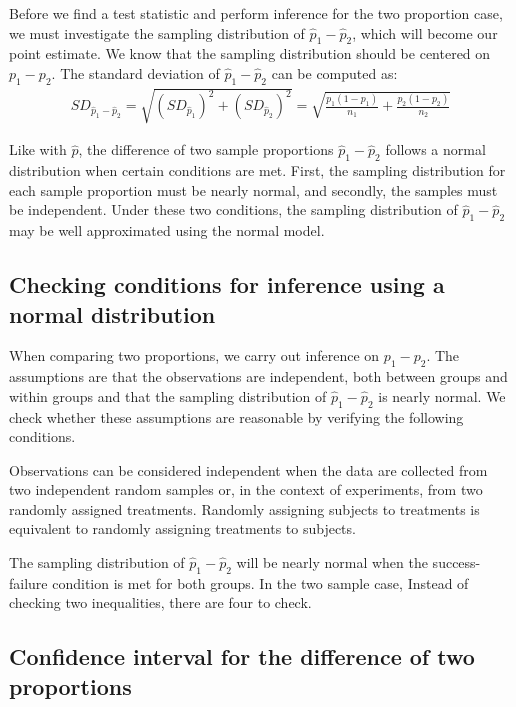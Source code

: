 Before we find a test statistic and perform inference for the two proportion case, we must investigate the sampling distribution of $\hat{p}_1-\hat{p}_2$, which will become our point estimate.  We know that the sampling distribution should be centered on $p_1-p_2$.  The standard deviation of $\hat{p}_1-\hat{p}_2$ can be computed as:
\begin{align*}
SD_{\hat{p}_1 - \hat{p}_2}
	= \sqrt{(SD_{\hat{p}_1})^2 + (SD_{\hat{p}_2})^2} 
	= \sqrt{\frac{p_1(1-p_1)}{n_1} + \frac{p_2(1-p_2)}{n_2}}
\end{align*}

Like with $\hat{p}$, the difference of two sample proportions $\hat{p}_1-\hat{p}_2$ follows a normal distribution when certain conditions are met.  First, the sampling distribution for each sample proportion must be nearly normal, and secondly, the samples must be independent. Under these two conditions, the sampling distribution of $\hat{p}_1 - \hat{p}_2$ may be well approximated using the normal model.


\subsection{Checking conditions for inference using a normal distribution}
When comparing two proportions, we carry out inference on $p_1-p_2$.  The assumptions are that the observations are independent, both between groups and within groups and that the sampling distribution of $\hat{p}_1-\hat{p}_2$ is nearly normal.  We check whether these assumptions are reasonable by verifying the following conditions.
\begin{description}
\setlength{\itemsep}{0mm}
\item[Independent.] Observations can be considered independent when the data are collected from two independent random samples or, in the context of experiments, from two randomly assigned treatments.  Randomly assigning subjects to treatments is equivalent to randomly assigning treatments to subjects.  
\item[Nearly normal sampling distribution.] The sampling distribution of $\hat{p}_1-\hat{p}_2$ will be nearly normal when the success-failure condition is met for both groups.  In the two sample case, Instead of checking two inequalities, there are four to check.
\end{description}



\subsection[Confidence interval for $p_1 -p_2$]{Confidence interval for the difference of two proportions}

